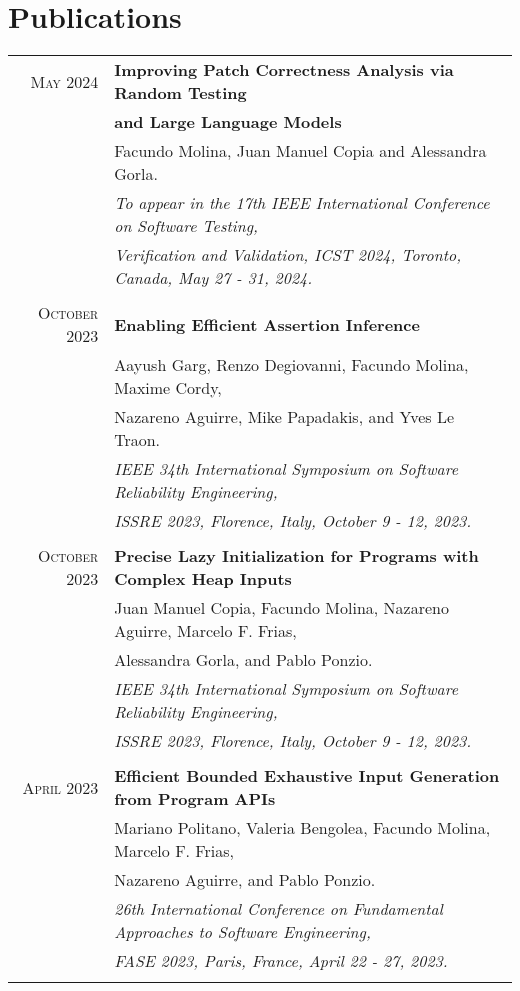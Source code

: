 \documentclass[a4paper,10pt]{article} %
\begin{document}
\section{Publications}
\begin{longtable}{rl}

\textsc{May} 2024  & \textbf{Improving Patch Correctness Analysis via Random Testing} \\
        & \textbf{and Large Language Models} \\
        & Facundo Molina, Juan Manuel Copia and Alessandra Gorla. \\
        & \textit{To appear in the 17th IEEE International Conference on Software Testing,} \\
        & \textit{Verification and Validation, ICST 2024, Toronto, Canada, May 27 - 31, 2024.} \\ & \\

\textsc{October} 2023  & \textbf{Enabling Efficient Assertion Inference} \\
        & Aayush Garg, Renzo Degiovanni, Facundo Molina, Maxime Cordy,\\
        & Nazareno Aguirre, Mike Papadakis, and Yves Le Traon. \\
        & \textit{IEEE 34th International Symposium on Software Reliability Engineering,} \\
        & \textit{ISSRE 2023, Florence, Italy, October 9 - 12, 2023.} \\ & \\

\textsc{October} 2023  & \textbf{Precise Lazy Initialization for Programs with Complex Heap Inputs} \\
        & Juan Manuel Copia, Facundo Molina, Nazareno Aguirre, Marcelo F. Frias,\\
        & Alessandra Gorla, and Pablo Ponzio. \\
        & \textit{IEEE 34th International Symposium on Software Reliability Engineering,} \\
        & \textit{ISSRE 2023, Florence, Italy, October 9 - 12, 2023.} \\ & \\

\textsc{April} 2023  & \textbf{Efficient Bounded Exhaustive Input Generation from Program APIs} \\
        & Mariano Politano, Valeria Bengolea, Facundo Molina, Marcelo F. Frias,\\
        & Nazareno Aguirre, and Pablo Ponzio. \\
	& \textit{26th International Conference on Fundamental Approaches to Software Engineering,} \\
        & \textit{FASE 2023, Paris, France, April 22 - 27, 2023.} \\ & \\


\end{longtable}
\end{document}
